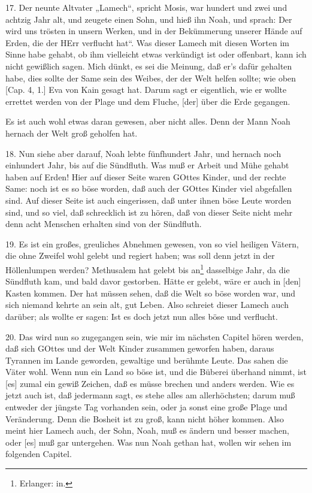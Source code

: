 17. Der neunte Altvater „Lamech“, spricht Mosis, war hundert und zwei und achtzig Jahr alt, und zeugete einen Sohn, und hieß ihn Noah, und sprach: Der wird uns trösten in unsern Werken, und in der Bekümmerung unserer Hände auf Erden, die der HErr verflucht hat“. Was dieser Lamech mit diesen Worten im Sinne habe gehabt, ob ihm vielleicht etwas verkündigt ist oder offenbart, kann ich nicht gewißlich sagen. Mich dünkt, es sei die Meinung, daß er’s dafür gehalten habe, dies sollte der Same sein des Weibes, der der Welt helfen sollte; wie oben [Cap. 4, 1.] Eva von Kain gesagt hat. Darum sagt er eigentlich, wie er wollte errettet werden von der Plage und dem Fluche, [der] über die Erde gegangen.

Es ist auch wohl etwas daran gewesen, aber nicht alles. Denn der Mann Noah hernach der Welt groß geholfen hat.

18. Nun siehe aber darauf, Noah lebte fünfhundert Jahr, und hernach noch einhundert Jahr, bis auf die Sündfluth. Was muß er Arbeit und Mühe gehabt haben auf Erden! Hier auf dieser Seite waren GOttes Kinder, und der rechte Same: noch ist es so böse worden, daß auch der GOttes Kinder viel abgefallen sind. Auf dieser Seite ist auch eingerissen, daß unter ihnen böse Leute worden sind, und so viel, daß schrecklich ist zu hören, daß von dieser Seite nicht mehr denn acht Menschen erhalten sind von der Sündfluth.

19. Es ist ein großes, greuliches Abnehmen gewesen, von so viel heiligen Vätern, die ohne Zweifel wohl gelebt und regiert haben; was soll denn jetzt in der Höllenlumpen werden? Methusalem hat gelebt bis an\footnote{Erlanger: in.} dasselbige Jahr, da die Sündfluth kam, und bald davor gestorben. Hätte er gelebt, wäre er auch in [den] Kasten kommen. Der hat müssen sehen, daß die Welt so böse worden war, und sich niemand kehrte an sein alt, gut Leben. Also schreiet dieser Lamech auch darüber; als wollte er sagen: Ist es doch jetzt nun alles böse und verflucht.

20. Das wird nun so zugegangen sein, wie mir im nächsten Capitel hören werden, daß sich GOttes und der Welt Kinder zusammen geworfen haben, daraus Tyrannen im Lande geworden, gewaltige und berühmte Leute. Das sahen die Väter wohl. Wenn nun ein Land so böse ist, und die Büberei überhand nimmt, ist [es] zumal ein gewiß Zeichen, daß es müsse brechen und anders werden. Wie es jetzt auch ist, daß jedermann sagt, es stehe alles am allerhöchsten; darum muß entweder der jüngste Tag vorhanden sein, oder ja sonst eine große Plage und Veränderung. Denn die Bosheit ist zu groß, kann nicht höher kommen. Also meint hier Lamech auch, der Sohn, Noah, muß es ändern und besser machen, oder [es] muß gar untergehen. Was nun Noah gethan hat, wollen wir sehen im folgenden Capitel.

